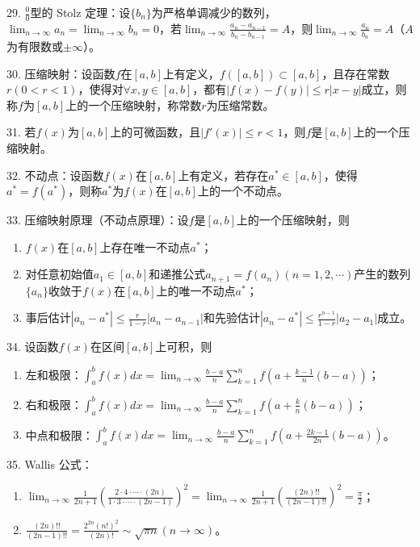 \documentclass[UTF8]{ctexart}
\theoremstyle{remark}
\begin{document}
	29. \(\frac{0}{0}\)型的 Stolz 定理：设\(\{b_n\}\)为严格单调减少的数列，\(\lim_{n\rightarrow\infty}a_n = \lim_{n\rightarrow\infty}b_n = 0\)，若\(\lim_{n\rightarrow\infty}\frac{a_n - a_{n - 1}}{b_n - b_{n - 1}} = A\)，则\(\lim_{n\rightarrow\infty}\frac{a_n}{b_n}=A\)（\(A\)为有限数或\(\pm\infty\)）。
	
	30. 压缩映射：设函数\(f\)在\([a,b]\)上有定义，\(f([a,b])\subset[a,b]\)，且存在常数\(r(0 < r < 1)\)，使得对\(\forall x,y\in[a,b]\)，都有\(|f(x) - f(y)|\leq r|x - y|\)成立，则称\(f\)为\([a,b]\)上的一个压缩映射，称常数\(r\)为压缩常数。
	
	31. 若\(f(x)\)为\([a,b]\)上的可微函数，且\(|f'(x)|\leq r < 1\)，则\(f\)是\([a,b]\)上的一个压缩映射。
	
	32. 不动点：设函数\(f(x)\)在\([a,b]\)上有定义，若存在\(a^*\in[a,b]\)，使得\(a^* = f(a^*)\)，则称\(a^*\)为\(f(x)\)在\([a,b]\)上的一个不动点。
	
	33. 压缩映射原理（不动点原理）：设\(f\)是\([a,b]\)上的一个压缩映射，则
	\begin{enumerate}
		\item \(f(x)\)在\([a,b]\)上存在唯一不动点\(a^*\)；
		\item 对任意初始值\(a_1\in[a,b]\)和递推公式\(a_{n + 1} = f(a_n)(n = 1,2,\cdots)\)产生的数列\(\{a_n\}\)收敛于\(f(x)\)在\([a,b]\)上的唯一不动点\(a^*\)；
		\item 事后估计\(|a_n - a^*|\leq\frac{r}{1 - r}|a_n - a_{n - 1}|\)和先验估计\(|a_n - a^*|\leq\frac{r^{n - 1}}{1 - r}|a_2 - a_1|\)成立。
	\end{enumerate}
	
	34. 设函数\(f(x)\)在区间\([a,b]\)上可积，则
	\begin{enumerate}
		\item 左和极限：\(\int_{a}^{b}f(x)dx=\lim_{n\rightarrow\infty}\frac{b - a}{n}\sum_{k = 1}^{n}f\left(a+\frac{k - 1}{n}(b - a)\right)\)；
		\item 右和极限：\(\int_{a}^{b}f(x)dx=\lim_{n\rightarrow\infty}\frac{b - a}{n}\sum_{k = 1}^{n}f\left(a+\frac{k}{n}(b - a)\right)\)；
		\item 中点和极限：\(\int_{a}^{b}f(x)dx=\lim_{n\rightarrow\infty}\frac{b - a}{n}\sum_{k = 1}^{n}f\left(a+\frac{2k - 1}{2n}(b - a)\right)\)。
	\end{enumerate}
	
	35. Wallis 公式：
	\begin{enumerate}
		\item \(\lim_{n\rightarrow\infty}\frac{1}{2n + 1}\left(\frac{2\cdot4\cdot\cdots\cdot(2n)}{1\cdot3\cdot\cdots\cdot(2n - 1)}\right)^2=\lim_{n\rightarrow\infty}\frac{1}{2n + 1}\left(\frac{(2n)!!}{(2n - 1)!!}\right)^2=\frac{\pi}{2}\)；
		\item \(\frac{(2n)!!}{(2n - 1)!!}=\frac{2^{2n}(n!)^2}{(2n)!}\sim\sqrt{\pi n}(n\rightarrow\infty)\)。
	\end{enumerate}
	
\end{document}
